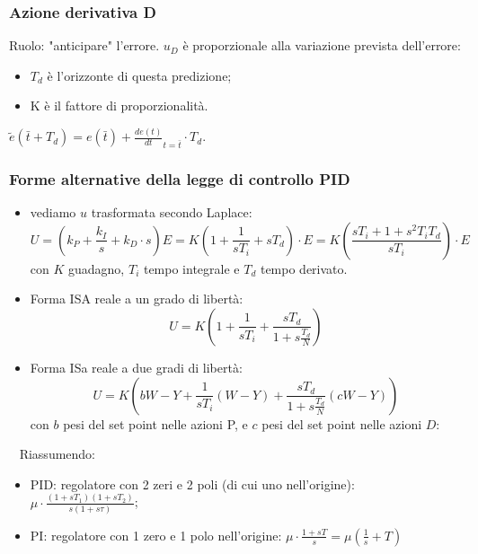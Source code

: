 \begin{landscape}
\begin{multicols*}{3}
    \subsubsection*{Azione derivativa D}
    Ruolo: "anticipare" l'errore.\newline
    \newline
    $u_D$ è proporzionale alla variazione prevista dell'errore:
    \begin{itemize}
        \item $T_d$ è l'orizzonte di questa predizione;
        \item K è il fattore di proporzionalità.
    \end{itemize}
    $\tilde{e}(\bar{t} + T_d) = e(\bar{t}) + \frac{d e(t)}{dt}_{t= \bar{t}} \cdot T_d$.
    \subsubsection*{Forme alternative della legge di controllo PID}
    \begin{itemize}
        \item vediamo $u$ trasformata secondo Laplace:
        \[
            U = (k_P + \frac{k_I}{s} + k_D \cdot s) E = K ( 1 + \frac{1}{sT_i} + s T_d) \cdot E = K \left( \frac{sT_i + 1 + s^2 T_i T_d}{sT_i} \right) \cdot E
        \]
        con $K$ guadagno, $T_i$ tempo integrale e $T_d$ tempo derivato.
        \item Forma ISA reale a un grado di libertà:
        \[
            U = K \left( 1+ \frac{1}{sT_i} + \frac{sT_d}{1+s \frac{T_d}{N}}\right)
        \]
        \item Forma ISa reale a due gradi di libertà:
        \[
            U = K \left( b W - Y + \frac{1}{sT_i}(W-Y) + \frac{sT_d}{1+s \frac{T_d}{N}} (c W-Y)\right)
        \]
        con $b$ pesi del set point nelle azioni P, e $c$ pesi del set point nelle azioni $D$:
    \end{itemize}
    \ \newline
    Riassumendo:
    \begin{itemize}
        \item PID: regolatore con 2 zeri e 2 poli (di cui uno nell'origine): $\mu \cdot \frac{(1+sT_1) (1+sT_2)}{s(1+s \tau)}$;
        \item PI: regolatore con 1 zero e 1 polo nell'origine: $\mu \cdot  \frac{1+sT}{s} = \mu(\frac{1}{s}+ T)$ 
    \end{itemize} 

\end{multicols*}
\end{landscape}
